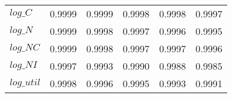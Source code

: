 \begin{center}
\begin{longtable}{lccccc}
$log\_C     $	 & 	     0.9999	 & 	     0.9999	 & 	     0.9998	 & 	     0.9998	 & 	     0.9997 \\ 
$log\_N     $	 & 	     0.9999	 & 	     0.9998	 & 	     0.9997	 & 	     0.9996	 & 	     0.9995 \\ 
$log\_NC    $	 & 	     0.9999	 & 	     0.9998	 & 	     0.9997	 & 	     0.9997	 & 	     0.9996 \\ 
$log\_NI    $	 & 	     0.9997	 & 	     0.9993	 & 	     0.9990	 & 	     0.9988	 & 	     0.9985 \\ 
$log\_util  $	 & 	     0.9998	 & 	     0.9996	 & 	     0.9995	 & 	     0.9993	 & 	     0.9991 \\ 
\end{longtable}
 \end{center}
